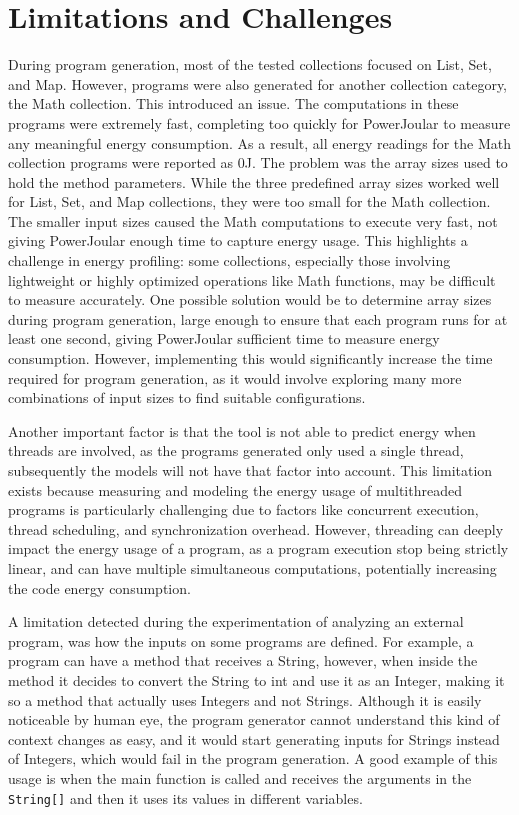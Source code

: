 \section{Limitations and Challenges} \label{sec:limitations_and_challenges}

During program generation, most of the tested collections focused on List, Set, and Map. However, programs were also generated for another collection category, the Math collection. This introduced an issue. The computations in these programs were extremely fast, completing too quickly for PowerJoular to measure any meaningful energy consumption. As a result, all energy readings for the Math collection programs were reported as 0J.
The problem was the array sizes used to hold the method parameters. While the three predefined array sizes worked well for List, Set, and Map collections, they were too small for the Math collection. The smaller input sizes caused the Math computations to execute very fast, not giving PowerJoular enough time to capture energy usage.
This highlights a challenge in energy profiling: some collections, especially those involving lightweight or highly optimized operations like Math functions, may be difficult to measure accurately. One possible solution would be to determine array sizes during program generation, large enough to ensure that each program runs for at least one second, giving PowerJoular sufficient time to measure energy consumption. However, implementing this would significantly increase the time required for program generation, as it would involve exploring many more combinations of input sizes to find suitable configurations.


Another important factor is that the tool is not able to predict energy when threads are involved, as the programs generated only used a single thread, subsequently the models will not have that factor into account. This limitation exists because measuring and modeling the energy usage of multithreaded programs is particularly challenging due to factors like concurrent execution, thread scheduling, and synchronization overhead. However, threading can deeply impact the energy usage of a program, as a program execution stop being strictly linear, and can have multiple simultaneous computations, potentially increasing the code energy consumption.

{\color{blue}
  A limitation detected during the experimentation of analyzing an external program, was how the inputs on some programs are defined. For example, a program can have a method that receives a String, however, when inside the method it decides to convert the String to int and use it as an Integer, making it so a method that actually uses Integers and not Strings. Although it is easily noticeable by human eye, the program generator cannot understand this kind of context changes as easy, and it would start generating inputs for Strings instead of Integers, which would fail in the program generation. A good example of this usage is when the main function is called and receives the arguments in the \texttt{String[]} and then it uses its values in different variables.
}




